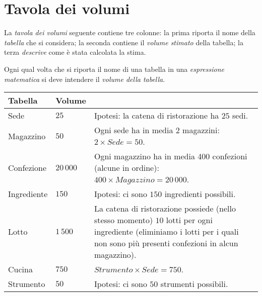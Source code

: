 \section{Tavola dei volumi}\label{sec:volumetable}
La {\it tavola dei volumi} seguente contiene tre colonne: la prima riporta il nome della
{\it tabella} che si considera; la seconda contiene il {\it volume stimato} della tabella; la terza
{\it descrive} come è stata calcolata la stima.

Ogni qual volta che si riporta il nome di una tabella in una {\it espressione matematica} si deve
intendere il {\it volume della tabella}.

{\tabulinesep=3pt
\begin{longtabu} to 
\hline\rowfont\bfseries
{\Large Tabella}& Volume        & 
\\ \hline \hline \hline \hline \hline %
\endhead
Sede            & \(25\)        & Ipotesi: la catena di ristorazione ha \(25\) sedi.
    \\ \hline %
Magazzino       & \(50\)        & Ogni sede ha in media 2 magazzini: \(2 \times Sede = 50\).
    \\ \hline %
Confezione      & \(20\,000\)   & Ogni magazzino ha in media 400 confezioni (alcune in ordine): \(400 \times Magazzino = 20\,000\).
    \\ \hline %
Ingrediente     & \(150\)       & Ipotesi: ci sono \(150\) ingredienti possibili.
    \\ \hline %
Lotto           & \(1\,500\)    & La catena di ristorazione possiede (nello stesso momento) \(10\)
                                  lotti per ogni ingrediente (eliminiamo i lotti per i quali
                                  non sono più presenti confezioni in alcun magazzino).
    \\ \hline %
Cucina          & \(750\)       & \(Strumento \times Sede = 750\).
    \\ \hline %
Strumento       & \(50\)        & Ipotesi: ci sono \(50\) strumenti possibili.
    \\ \hline %

\end{longtabu}}
